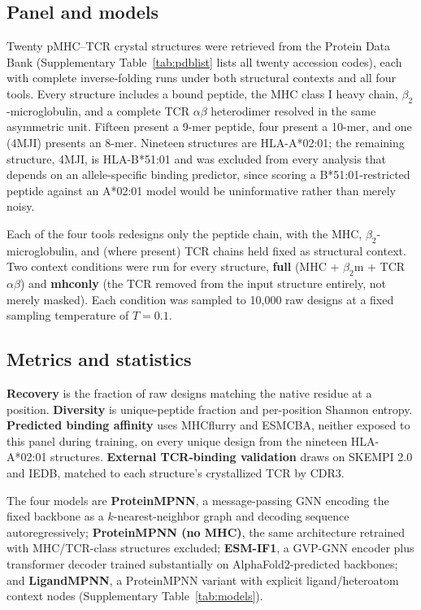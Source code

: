 \documentclass[letterpaper]{article}
\begin{document}
\subsection{Panel and models}

Twenty pMHC--TCR crystal structures were retrieved from the Protein Data Bank (Supplementary
Table~\ref{tab:pdblist} lists all twenty accession codes), each with complete inverse-folding runs under
both structural contexts and all four tools. Every structure includes a bound peptide, the MHC class I
heavy chain, $\beta_2$-microglobulin, and a complete TCR $\alpha\beta$ heterodimer resolved in the same
asymmetric unit. Fifteen present a 9-mer peptide, four present a 10-mer, and one (4MJI) presents an
8-mer. Nineteen structures are HLA-A*02:01; the remaining structure, 4MJI, is HLA-B*51:01 and was
excluded from every analysis that depends on an allele-specific binding predictor, since scoring a
B*51:01-restricted peptide against an A*02:01 model would be uninformative rather than merely noisy.

Each of the four tools redesigns only the peptide chain, with the MHC, $\beta_2$-microglobulin, and
(where present) TCR chains held fixed as structural context. Two context conditions were run for every
structure, \textbf{full} (MHC + $\beta_2$m + TCR$\alpha\beta$) and \textbf{mhconly} (the TCR removed
from the input structure entirely, not merely masked). Each condition was sampled to 10,000 raw designs
at a fixed sampling temperature of $T=0.1$.

\subsection{Metrics and statistics}

\textbf{Recovery} is the fraction of raw designs matching the native residue at a position.
\textbf{Diversity} is unique-peptide fraction and per-position Shannon entropy. \textbf{Predicted binding
affinity} uses MHCflurry and ESMCBA, neither exposed to
this panel during training, on every unique design from the nineteen HLA-A*02:01 structures.
\textbf{External TCR-binding validation} draws on SKEMPI 2.0 and IEDB, matched to each structure's
crystallized TCR by CDR3.

The four models are \textbf{ProteinMPNN}, a message-passing GNN encoding the fixed backbone as a
$k$-nearest-neighbor graph and decoding sequence autoregressively; \textbf{ProteinMPNN (no MHC)}, the
same architecture retrained with MHC/TCR-class structures excluded; \textbf{ESM-IF1}, a GVP-GNN encoder
plus transformer decoder trained substantially on AlphaFold2-predicted backbones; and
\textbf{LigandMPNN}, a ProteinMPNN variant with explicit ligand/heteroatom context nodes (Supplementary
Table~\ref{tab:models}).
\end{document}
